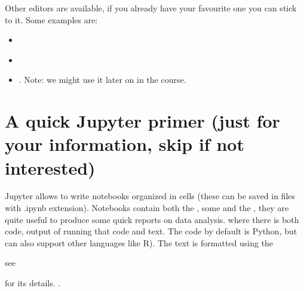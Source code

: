 \documentclass[letterpaper,10pt,english]{sphinxmanual}
\begin{document}
\sphinxAtStartPar
Other editors are available, if you already have your favourite one you can stick to it. Some examples are:
\begin{itemize}
\item {} 
\sphinxAtStartPar
{}%
\begin{footnote}[7]\sphinxAtStartFootnote
{}
%
\end{footnote}

\item {} 
\sphinxAtStartPar
{}%
\begin{footnote}[8]\sphinxAtStartFootnote
{}
%
\end{footnote}

\item {} 
\sphinxAtStartPar
{}%
\begin{footnote}[9]\sphinxAtStartFootnote
{}
%
\end{footnote}. Note: we might use it later on in the course.

\end{itemize}


\section{A quick Jupyter primer (just for your information, skip if not interested)}
\label{\detokenize{M1_practical1:A-quick-Jupyter-primer-(just-for-your-information,-skip-if-not-interested)}}
\sphinxAtStartPar
Jupyter allows to write notebooks organized in cells (these can be saved in files with .ipynb extension). Notebooks contain both the , some  and the , they are quite useful to produce some quick reports on data analysis. where there is both code, output of running that code and text. The code by default is Python, but can also support other languages like R). The text is formatted using the %
\begin{footnote}[10]\sphinxAtStartFootnote
{}
%
\end{footnote} \sphinxhyphen{} see %
\begin{footnote}[11]\sphinxAtStartFootnote
{}
%
\end{footnote} for its details. .
\end{document}

